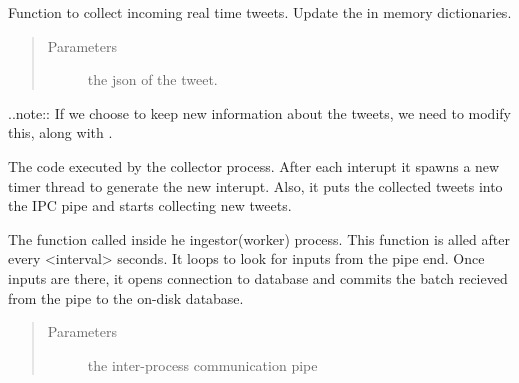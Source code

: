 \documentclass[letterpaper,10pt,english]{sphinxmanual}
\begin{document}
\begin{fulllineitems}
\begin{fulllineitems}
\label{\detokenize{mongoDB_data_ingestion:ingest_raw.Ingest.insert_tweet}}
Function to collect incoming real time tweets. Update the in memory dictionaries.
\begin{quote}\begin{description}
\item[{Parameters}] \leavevmode
{} \textendash{} the json of the tweet.

\end{description}\end{quote}

..note:: If we choose to keep new information about the tweets, we need to modify this, along with {\hyperref[\detokenize{mongoDB_data_ingestion:ingest_raw.Ingest.worker}]{}}.

\end{fulllineitems}


\begin{fulllineitems}
\label{\detokenize{mongoDB_data_ingestion:ingest_raw.Ingest.populate}}
The code executed by the collector process. After each interupt it spawns a new timer thread to generate the
new interupt. Also, it puts the collected tweets into the IPC pipe and starts collecting new tweets.

\end{fulllineitems}


\begin{fulllineitems}
\label{\detokenize{mongoDB_data_ingestion:ingest_raw.Ingest.worker}}
The function called inside he ingestor(worker) process. This function is alled after every \textless{}interval\textgreater{}
seconds. It loops to look for inputs from the pipe end. Once inputs are there, it opens connection to
database and commits the batch recieved from the pipe to the on-disk database.
\begin{quote}\begin{description}
\item[{Parameters}] \leavevmode
{} \textendash{} the inter-process communication pipe

\end{description}\end{quote}

\end{fulllineitems}


\end{fulllineitems}
\end{document}
